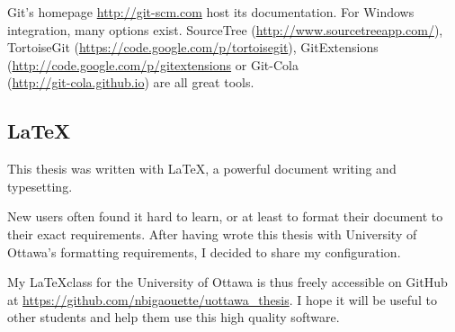 Git's homepage \url{http://git-scm.com} host its documentation. For Windows
integration, many options exist.
SourceTree (\url{http://www.sourcetreeapp.com/}),
TortoiseGit (\url{https://code.google.com/p/tortoisegit}),
GitExtensions (\url{http://code.google.com/p/gitextensions}
or Git-Cola \\
(\url{http://git-cola.github.io}) are all great tools.


\subsection*{\LaTeX}

This thesis was written with \LaTeX, a powerful document writing and typesetting.

New users often found it hard to learn, or at least to format their document
to their exact requirements. After having wrote this thesis with University of
Ottawa's formatting requirements, I decided to share my configuration.

My \LaTeX class for the University of Ottawa is thus freely accessible on
GitHub at \url{https://github.com/nbigaouette/uottawa_thesis}. I hope it will
be useful to other students and help them use this high quality software.




